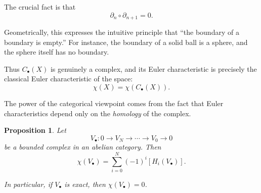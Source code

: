 \documentclass[12pt,reqno]{amsart}
\theoremstyle{plain}
\newtheorem{prop}[thm]{Proposition}
\numberwithin{equation}{section}
\begin{document}
The crucial fact is that
\[
\partial_n\circ \partial_{n+1}=0.
\]

Geometrically, this expresses the intuitive principle that ``the boundary of a boundary is empty.'' For instance, the boundary of a solid ball is a sphere, and the sphere itself has no boundary.

Thus $C_\bullet(X)$ is genuinely a complex, and its Euler characteristic is precisely the classical Euler characteristic of the space:
\[
\chi(X)=\chi(C_\bullet(X)).
\]

The power of the categorical viewpoint comes from the fact that Euler characteristics depend only on the \emph{homology} of the complex.

\begin{prop}\label{prop: Eulerchar}
Let
\[
V_\bullet:
0\to V_N\to \cdots \to V_0\to 0
\]
be a bounded complex in an abelian category. Then
\[
\chi(V_\bullet)
=
\sum_{i=0}^N (-1)^i [H_i(V_\bullet)].
\]

In particular, if $V_\bullet$ is exact, then $\chi(V_\bullet)=0$.
\end{prop}
\end{document}
